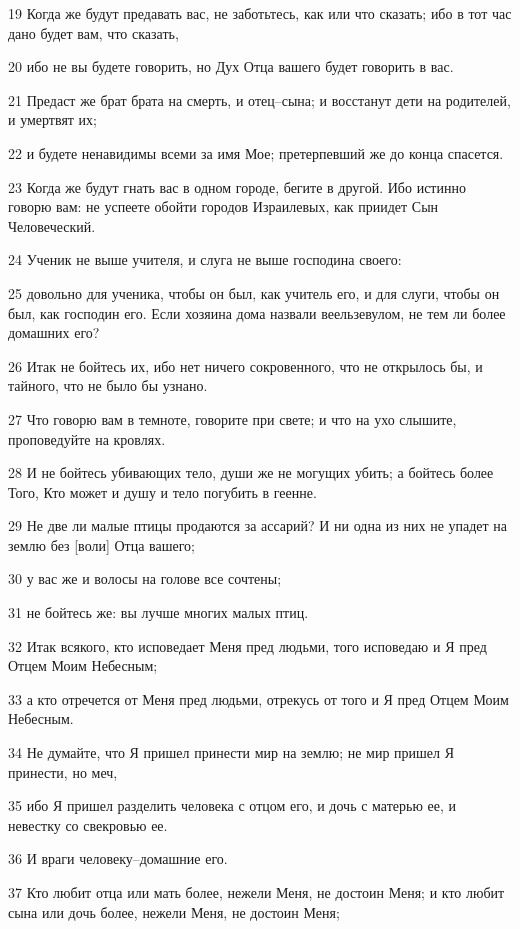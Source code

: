 \par 19 Когда же будут предавать вас, не заботьтесь, как или что сказать; ибо в тот час дано будет вам, что сказать,
\par 20 ибо не вы будете говорить, но Дух Отца вашего будет говорить в вас.
\par 21 Предаст же брат брата на смерть, и отец--сына; и восстанут дети на родителей, и умертвят их;
\par 22 и будете ненавидимы всеми за имя Мое; претерпевший же до конца спасется.
\par 23 Когда же будут гнать вас в одном городе, бегите в другой. Ибо истинно говорю вам: не успеете обойти городов Израилевых, как приидет Сын Человеческий.
\par 24 Ученик не выше учителя, и слуга не выше господина своего:
\par 25 довольно для ученика, чтобы он был, как учитель его, и для слуги, чтобы он был, как господин его. Если хозяина дома назвали веельзевулом, не тем ли более домашних его?
\par 26 Итак не бойтесь их, ибо нет ничего сокровенного, что не открылось бы, и тайного, что не было бы узнано.
\par 27 Что говорю вам в темноте, говорите при свете; и что на ухо слышите, проповедуйте на кровлях.
\par 28 И не бойтесь убивающих тело, души же не могущих убить; а бойтесь более Того, Кто может и душу и тело погубить в геенне.
\par 29 Не две ли малые птицы продаются за ассарий? И ни одна из них не упадет на землю без [воли] Отца вашего;
\par 30 у вас же и волосы на голове все сочтены;
\par 31 не бойтесь же: вы лучше многих малых птиц.
\par 32 Итак всякого, кто исповедает Меня пред людьми, того исповедаю и Я пред Отцем Моим Небесным;
\par 33 а кто отречется от Меня пред людьми, отрекусь от того и Я пред Отцем Моим Небесным.
\par 34 Не думайте, что Я пришел принести мир на землю; не мир пришел Я принести, но меч,
\par 35 ибо Я пришел разделить человека с отцом его, и дочь с матерью ее, и невестку со свекровью ее.
\par 36 И враги человеку--домашние его.
\par 37 Кто любит отца или мать более, нежели Меня, не достоин Меня; и кто любит сына или дочь более, нежели Меня, не достоин Меня;
